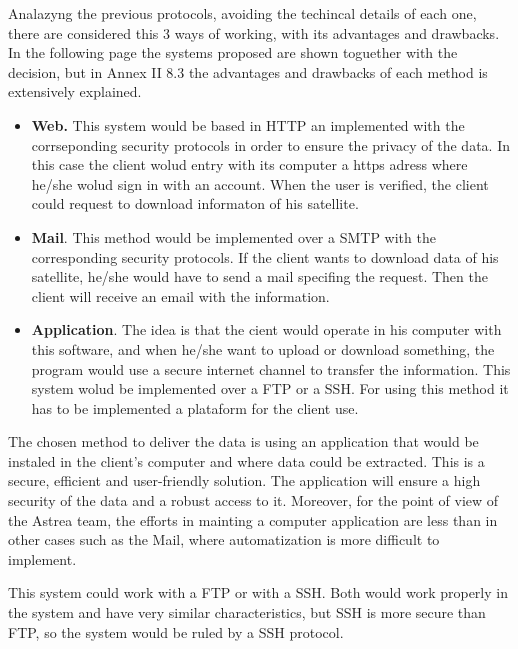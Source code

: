 Analazyng the previous protocols, avoiding the techincal details of each one, there are considered this 3 ways of working, with its advantages and drawbacks. In the following page the systems proposed are shown toguether with the decision, but in Annex II 8.3 the advantages and drawbacks of each method is extensively explained.
\begin{itemize}
\item \textbf{Web.} This system would be based in HTTP an implemented with the corrseponding security protocols in order to ensure the privacy of the data. In this case the client wolud entry with its computer a https adress where he/she wolud sign in with an account. When the user is verified, the client could request to download informaton of his satellite. 
\item \textbf{Mail}. This method would be implemented over a SMTP with the corresponding security protocols. If the client wants to download data of his satellite, he/she would have to send a mail specifing the request. Then the client will receive an email with the information.
\item \textbf{Application}.  The idea is that the cient would operate in his computer with this software, and when he/she want to upload or download something, the program would use a secure internet channel to transfer the information. This system wolud be implemented over a FTP or a SSH. For using this method it has to be implemented a plataform for the client use.
\end{itemize}

The chosen method to deliver the data is using an application that would be instaled in the client's computer and where data could be extracted. This is a secure, efficient and user-friendly solution. The application will ensure a high security of the data and a robust access to it. Moreover, for the point of view of the Astrea team, the efforts in mainting a computer application are less than in other cases such as the Mail, where automatization is more difficult to implement.

This system could work with a FTP or with a SSH. Both would work properly in the system and have very similar characteristics, but SSH is more secure than FTP, so the system would be ruled by a SSH protocol.